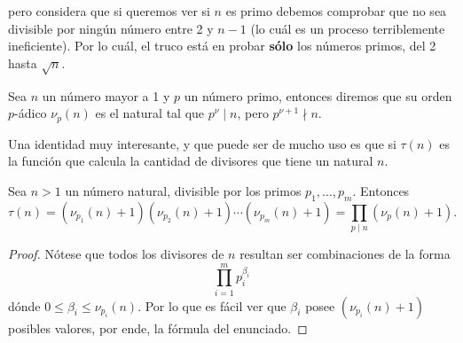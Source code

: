 \documentclass[11pt,oneside]{book}
\begin{document}
pero considera que si queremos ver si $n$ es primo debemos comprobar que no sea divisible por ningún número entre 2 y $n-1$ (lo cuál es un proceso terriblemente ineficiente). Por lo cuál, el truco está en probar \textbf{sólo} los números primos, del 2 hasta $\sqrt{n}$.
\begin{mydef}
Sea $n$ un número mayor a 1 y $p$ un número primo, entonces diremos que su orden $p$-ádico $\nu_p(n)$  es el natural tal que $p^\nu\mid n$, pero $p^{\nu+1}\nmid n$.
\end{mydef}
Una identidad muy interesante, y que puede ser de mucho uso es que si $\tau(n)$ es la función que calcula la cantidad de divisores que tiene un natural $n$.
\begin{thm}
Sea $n\gt 1$ un número natural, divisible por los primos $p_1,\dots,p_m$. Entonces
$$\tau(n)=(\nu_{p_1}(n)+1)(\nu_{p_2}(n)+1)\cdots(\nu_{p_m}(n)+1)=\prod_{p\mid n}(\nu_p(n)+1).$$
\end{thm}
\begin{proof}
Nótese que todos los divisores de $n$ resultan ser combinaciones de la forma
$$\prod_{i=1}^m p_i^{\beta_i}$$
dónde $0\leq\beta_i\leq\nu_{p_i}(n)$. Por lo que es fácil ver que $\beta_i$ posee $(\nu_{p_i}(n)+1)$ posibles valores, por ende, la fórmula del enunciado.
\end{proof}
\end{document}
